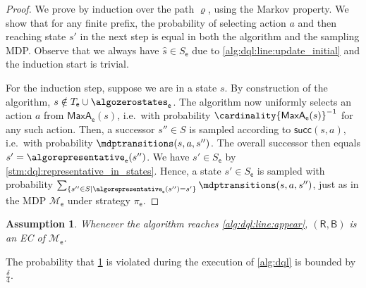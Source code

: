 \documentclass{theoretics}
\newcommand{\unionSym}{\cup}
\newcommand{\unionBin}{\mathbin{\unionSym}}
\newcommand{\union}{\unionBin}
\newcommand{\MDP}{\mathcal{M}}
\newcommand{\States}{S}
\newcommand{\initialstate}{\hat{s}}
\newcommand{\finitepath}{\varrho}
\newcommand{\strategy}{\pi}
\newcommand{\targetset}{T}
\newcommand{\successor}{\mathsf{succ}}
\newcommand{\algoepisode}{\mathsf{e}}
\newcommand{\umaxactions}{\mathsf{MaxA}}
\newtheorem{assumption}{Assumption}
\begin{document}
\begin{proof}
	We prove by induction over the path $\finitepath$, using the Markov property.
	We show that for any finite prefix, the probability of selecting action $a$ and then reaching state $s'$ in the next step is equal in both the algorithm and the sampling MDP.
	Observe that we always have $\initialstate \in \States_\algoepisode$ due to \cref{alg:dql:line:update_initial} and the induction start is trivial.

	For the induction step, suppose we are in a state $s$.
	By construction of the algorithm, $s \notin \targetset_\algoepisode \union \algozerostates_\algoepisode$.
	The algorithm now uniformly selects an action $a$ from $\umaxactions_\algoepisode(s)$, i.e.\ with probability $\cardinality{\umaxactions_\algoepisode(s)}^{-1}$ for any such action.
	Then, a successor $s'' \in \States$ is sampled according to $\successor(s, a)$, i.e.\ with probability $\mdptransitions(s, a, s'')$.
	The overall successor then equals $s' = \algorepresentative_\algoepisode(s'')$.
	We have $s' \in \States_\algoepisode$ by \cref{stm:dql:representative_in_states}.
	Hence, a state $s' \in \States_\algoepisode$ is sampled with probability $\sum_{\{s'' \in \States \mid \algorepresentative_\algoepisode(s'') = s'\}} \mdptransitions(s, a, s'')$, just as in the MDP $\MDP_\algoepisode$ under strategy $\strategy_\algoepisode$. 
\end{proof}

\begin{assumption} \label{asm:dql:always_collapse_ec}
	Whenever the algorithm reaches \cref{alg:dql:line:appear}, $(\mathsf{R}, \mathsf{B})$ is an EC of $\MDP_\algoepisode$.
\end{assumption}

\begin{lemma} \label{stm:dql:always_collapse_ec_probability}
	The probability that \cref{asm:dql:always_collapse_ec} is violated during the execution of \cref{alg:dql} is bounded by $\frac{\delta}{4}$.
\end{lemma}
\end{document}
